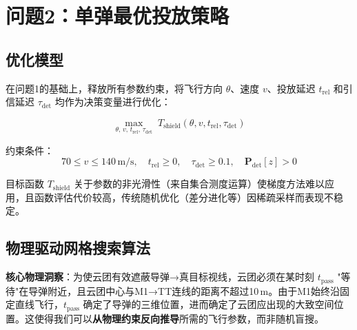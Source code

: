 \documentclass[12pt, a4paper]{article}
\begin{document}
\section{问题2：单弹最优投放策略}

\subsection{优化模型}

在问题1的基础上，释放所有参数约束，将飞行方向 $\theta$、速度 $v$、投放延迟 $t_{\mathrm{rel}}$ 和引信延迟 $\tau_{\mathrm{det}}$ 均作为决策变量进行优化：

\begin{equation}
\max_{\theta,\,v,\,t_{\mathrm{rel}},\,\tau_{\mathrm{det}}} \; T_{\mathrm{shield}}(\theta,v,t_{\mathrm{rel}},\tau_{\mathrm{det}})
\end{equation}

约束条件：
\begin{equation}
70 \le v \le 140\,\text{m/s},\quad t_{\mathrm{rel}} \ge 0,\quad \tau_{\mathrm{det}} \ge 0.1,\quad \boldsymbol{P}_{\mathrm{det}}[z] > 0
\end{equation}

目标函数 $T_{\mathrm{shield}}$ 关于参数的非光滑性（来自集合测度运算）使梯度方法难以应用，且函数评估代价较高，传统随机优化（差分进化等）因稀疏采样而表现不稳定。

\subsection{物理驱动网格搜索算法}

\begin{insightbox}
\textbf{核心物理洞察}：为使云团有效遮蔽导弹→真目标视线，云团必须在某时刻 $t_{\mathrm{pass}}$ "等待"在导弹附近，且云团中心与M1→TT连线的距离不超过10\,m。由于M1始终沿固定直线飞行，$t_{\mathrm{pass}}$ 确定了导弹的三维位置，进而确定了云团应出现的大致空间位置。这使得我们可以\textbf{从物理约束反向推导}所需的飞行参数，而非随机盲搜。
\end{insightbox}
\end{document}

